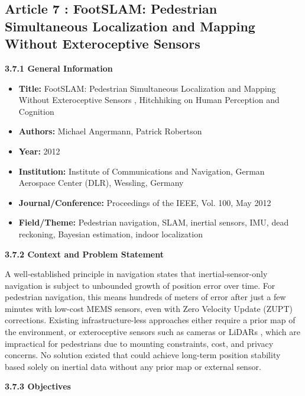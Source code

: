 \documentclass{ipgpmaster}
\begin{document}
\subsection{Article 7 : FootSLAM: Pedestrian Simultaneous Localization and Mapping Without Exteroceptive Sensors}


\textbf{3.7.1    General Information}

\begin{itemize}
    \item \textbf{Title:} FootSLAM: Pedestrian Simultaneous Localization and Mapping Without Exteroceptive Sensors ,  Hitchhiking on Human Perception and Cognition
    \item \textbf{Authors:} Michael Angermann, Patrick Robertson
    \item \textbf{Year:} 2012
    \item \textbf{Institution:} Institute of Communications and Navigation, German Aerospace Center (DLR), Wessling, Germany
    \item \textbf{Journal/Conference:} Proceedings of the IEEE, Vol. 100, May 2012
    \item \textbf{Field/Theme:} Pedestrian navigation, SLAM, inertial sensors, IMU, dead reckoning, Bayesian estimation, indoor localization


\end{itemize}
\textbf{3.7.2    Context and Problem Statement}

A well-established principle in navigation states that inertial-sensor-only navigation is subject to unbounded growth of position error over time. For pedestrian navigation, this means hundreds of meters of error after just a few minutes with low-cost MEMS sensors, even with Zero Velocity Update (ZUPT) corrections. Existing infrastructure-less approaches either require a prior map of the environment, or exteroceptive sensors such as cameras or LiDARs ,  which are impractical for pedestrians due to mounting constraints, cost, and privacy concerns. No solution existed that could achieve long-term position stability based solely on inertial data without any prior map or external sensor.

\textbf{3.7.3    Objectives}
\end{document}
